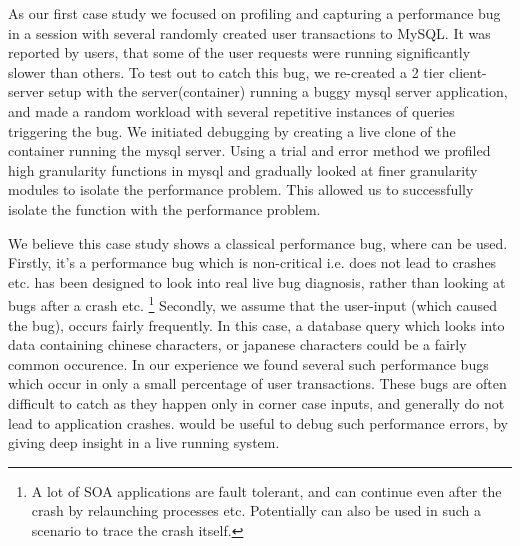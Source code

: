 As our first case study we focused on profiling and capturing a performance bug in a session with several randomly created user transactions to MySQL. 
It was reported by users, that some of the user requests were running significantly slower than others.
To test out \parikshan to catch this bug, we re-created a 2 tier client-server setup with the server(container) running a buggy mysql server application, and made a random workload with several repetitive instances of queries triggering the bug.
We initiated debugging by creating a live clone of the container running the mysql server.
Using a trial and error method we profiled high granularity functions in mysql and gradually looked at finer granularity modules to isolate the performance problem.
This allowed us to successfully isolate the function with the performance problem.

We believe this case study shows a classical performance bug, where \parikshan can be used.
Firstly, it's a performance bug which is non-critical i.e. does not lead to crashes etc.
\parikshan has been designed to look into real live bug diagnosis, rather than looking at bugs after a crash etc.
\footnote{A lot of SOA applications are fault tolerant, and can continue even after the crash by relaunching processes etc. Potentially \parikshan can also be used in such a scenario to trace the crash itself.}
Secondly, we assume that the user-input (which caused the bug), occurs fairly frequently.
In this case, a database query which looks into data containing chinese characters, or japanese characters could be a fairly common occurence.
In our experience we found several such performance bugs which occur in only a small percentage of user transactions.
These bugs are often difficult to catch as they happen only in corner case inputs, and generally do not lead to application crashes.
\parikshan would be useful to debug such performance errors, by giving deep insight in a live running system.
\fi

